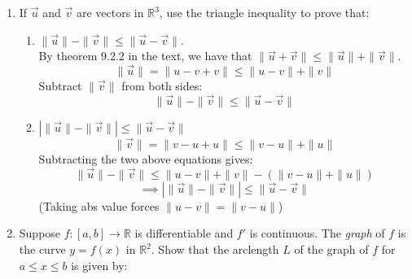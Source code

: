\documentclass[hidelinks,12pt]{article}
\renewcommand{\leq}{\leqslant}
\newcommand{\R}{\mathbb{R}}
\begin{document}
\begin{enumerate}
\begin{enumerate}
                Prove $(\gamma_n)$ converges.
                \begin{proof}
                    By the integral test we have $(\gamma_n)$ converges iff $\int_1^{\infty}f(x)dx$ converges, where $f(x)=\gamma_x$.\\
                    Suppose $\int_1^{\infty}f(x)dx$ converges, then:
                    \[S_{k+1}-\gamma_1\leq\int_1^{k+1}f(x)dx\leq\int_1^{\infty}f(x)dx\]
                    So $S_{k+1}$ is bounded, and we have by induction that $(\gamma_k)$ is increasing, therefore $(\gamma_k)$ converges.
                \end{proof}
            \item Show how consideration of the sequence $(\gamma_{2n}-\gamma_n)$ leads to a new proof of the identity:
                \[L(2)=1-\frac{1}{2}+\frac{1}{3}-\frac{1}{4}+\dots\]
                RHS is equal to \[\sum_{n=1}^{2m}(-1)^{n+1}\frac{1}{n}\]
                Splitting into even and odd terms gives:
                \[=\sum_{n=1}^{m}\frac{1}{2n-1}-\sum_{n=1}^m\frac{1}{2n}\]
                Which is
                \[\gamma_{2m}-2\gamma_m+L(2)\]
                Which limits to $L(2)$.
        \end{enumerate}
    \item If $\vec{u}$ and $\vec{v}$ are vectors in $\R^3$, use the triangle inequality to prove that:
        \begin{enumerate}
            \item $\|\vec{u}\|-\|\vec{v}\|\leq\|\vec{u}-\vec{v}\|$.\\
                By theorem 9.2.2 in the text, we have that $\|\vec{u}+\vec{v}\|\leq\|\vec{u}\|+\|\vec{v}\|$.
                \[\|\vec{u}\|=\|u-v+v\|\leq\|u-v\|+\|v\|\tag{By triangle inequality}\]
                Subtract $\|\vec{v}\|$ from both sides:
                \[\|\vec{u}\|-\|\vec{v}\|\leq\|\vec{u}-\vec{v}\|\]
            \item $|\|\vec{u}\|-\|\vec{v}\||\leq\|\vec{u}-\vec{v}\|$
                \[\|\vec{v}\|=\|v-u+u\|\leq\|v-u\|+\|u\|\tag{By triangle inequality}\]
                Subtracting the two above equations gives:
                \[\|\vec{u}\|-\|\vec{v}\|\leq\|u-v\|+\|v\|-(\|v-u\|+\|u\|)\]
                \[\implies |\|\vec{u}\|-\|\vec{v}\||\leq\|\vec{u}-\vec{v}\|\]
                (Taking abs value forces $\|u-v\|=\|v-u\|$)
        \end{enumerate}
    \item Suppose $f:[a,b]\to\R$ is differentiable and $f'$ is continuous. The \emph{graph} of $f$ is the curve $y=f(x)$ in $\R^2$. Show that the arclength $L$ of the graph of $f$ for $a\leq x\leq b$ is given by:

\end{enumerate}
\end{document}
